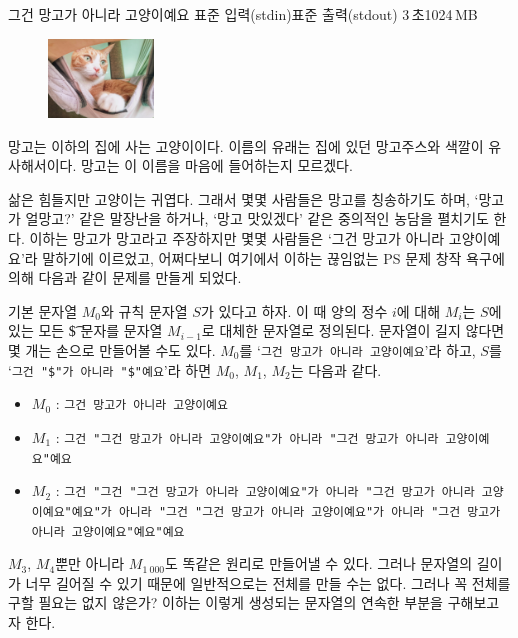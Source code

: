 \begin{problem}{그건 망고가 아니라 고양이예요}
    {표준 입력(stdin)}{표준 출력(stdout)}
    {3\,초}{1024\,MB}{}
    
\begin{figure}
    \centering
    \includegraphics[width=0.25\textwidth]{../pictures/mangomango.jpg}
\end{figure}

    망고는 이하의 집에 사는 고양이이다. 이름의 유래는 집에 있던 망고주스와 색깔이 유사해서이다. 망고는 이 이름을 마음에 들어하는지 모르겠다.
    
    삶은 힘들지만 고양이는 귀엽다. 그래서 몇몇 사람들은 망고를 칭송하기도 하며, `망고가 얼망고?' 같은 말장난을 하거나, `망고 맛있겠다' 같은 중의적인 농담을 펼치기도 한다. 이하는 망고가 망고라고 주장하지만 몇몇 사람들은 `그건 망고가 아니라 고양이예요'라 말하기에 이르었고, 어쩌다보니 여기에서 이하는 끊임없는 PS 문제 창작 욕구에 의해 다음과 같이 문제를 만들게 되었다.
    
    기본 문자열 $M_0$와 규칙 문자열 $S$가 있다고 하자. 이 때 양의 정수 $i$에 대해 $M_i$는 $S$에 있는 모든 \t{\$} 문자를 문자열 $M_{i-1}$로 대체한 문자열로 정의된다. 문자열이 길지 않다면 몇 개는 손으로 만들어볼 수도 있다. $M_0$를 `\texttt{그건 망고가 아니라 고양이예요}'라 하고, $S$를 `\texttt{그건 "\$"가 아니라 "\$"예요}'라 하면 $M_0$, $M_1$, $M_2$는 다음과 같다.
    
    \begin{itemize}
        \item $M_0$ : \texttt{그건 망고가 아니라 고양이예요}
        \item $M_1$ : \texttt{그건 "그건 망고가 아니라 고양이예요"가 아니라 "그건 망고가 아니라 고양이예요"예요}
        \item $M_2$ : \texttt{그건 "그건 "그건 망고가 아니라 고양이예요"가 아니라 "그건 망고가 아니라 고양이예요"예요"가 아니라 "그건 "그건 망고가 아니라 고양이예요"가 아니라 "그건 망고가 아니라 고양이예요"예요"예요}
    \end{itemize}
    
    $M_3$, $M_4$뿐만 아니라 $M_{1\ 000}$도 똑같은 원리로 만들어낼 수 있다. 그러나 문자열의 길이가 너무 길어질 수 있기 때문에 일반적으로는 전체를 만들 수는 없다. 그러나 꼭 전체를 구할 필요는 없지 않은가? 이하는 이렇게 생성되는 문자열의 연속한 부분을 구해보고자 한다.


\end{problem}
